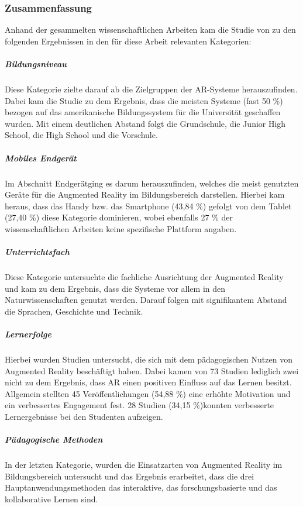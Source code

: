 \subsubsection{Zusammenfassung}
Anhand der gesammelten wissenschaftlichen Arbeiten kam die Studie von \citeauthor{hedberg:review-ar-learning} zu den folgenden Ergebnissen in den für diese Arbeit relevanten Kategorien:

\subparagraph{Bildungsniveau}
Diese Kategorie zielte darauf ab die Zielgruppen der AR-Systeme herauszufinden. Dabei kam die Studie zu dem Ergebnis, dass die meisten Systeme (fast 50 \%) bezogen auf das amerikanische Bildungssystem für die Universität geschaffen wurden. Mit einem deutlichen Abstand folgt die Grundschule, die Junior High School, die High School und die Vorschule. \citep[S. 78]{hedberg:review-ar-learning}

\subparagraph{Mobiles Endgerät}
Im Abschnitt \glqq Endgerät\grqq ging es darum herauszufinden, welches die meist genutzten Geräte für die Augmented Reality im Bildungsbereich darstellen. Hierbei kam heraus, dass das Handy bzw. das Smartphone (43,84 \%) gefolgt von dem Tablet (27,40 \%) diese Kategorie dominieren, wobei ebenfalls 27 \% der wissenschaftlichen Arbeiten keine spezifische Plattform angaben. \citep[S. 80]{hedberg:review-ar-learning}

\subparagraph{Unterrichtsfach}
Diese Kategorie untersuchte die fachliche Ausrichtung der Augmented Reality und kam zu dem Ergebnis, dass die Systeme vor allem in den Naturwissenschaften genutzt werden. Darauf folgen mit signifikantem Abstand die Sprachen, Geschichte und Technik. \citep[S. 81]{hedberg:review-ar-learning}

\subparagraph{Lernerfolge}
Hierbei wurden Studien untersucht, die sich mit dem pädagogischen Nutzen von Augmented Reality beschäftigt haben. Dabei kamen von 73 Studien lediglich zwei nicht zu dem Ergebnis, dass AR einen positiven Einfluss auf das Lernen besitzt.
Allgemein stellten 45 Veröffentlichungen (54,88 \%) eine erhöhte Motivation und ein verbessertes Engagement fest. 28 Studien (34,15 \%)konnten verbesserte Lernergebnisse bei den Studenten aufzeigen.  \citep[S. 81-82]{hedberg:review-ar-learning}

\subparagraph{Pädagogische Methoden}
In der letzten Kategorie, wurden die Einsatzarten von Augmented Reality im Bildungsbereich untersucht und das Ergebnis erarbeitet, dass die drei Hauptanwendungsmethoden das interaktive, das forschungsbasierte und das kollaborative Lernen sind. \citep[S. 82]{hedberg:review-ar-learning}

